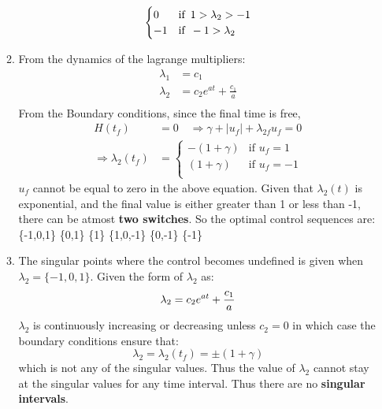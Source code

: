 \begin{enumerate}
\begin{enumerate}
\begin{align*}
\begin{cases}
                      0 & \mbox{if}\enskip 1 > \lambda_2 > -1\\
                      -1 & \mbox{if}\enskip -1 > \lambda_2 \\
                     \end{cases}
   \end{align*}
   \item From the dynamics of the lagrange multipliers:
   \begin{align*}
    \lambda_1 &= c_1\\
    \lambda_2 &= c_2 e^{at} + \frac{c_1}{a}\\
   \end{align*}
   From the Boundary conditions, since the final time is free,
   \begin{align*}
    H(t_f) &= 0 \quad \Rightarrow \gamma + |u_f| + \lambda_{2f} u_f = 0\\
    \Rightarrow \lambda_2(t_f) &= \begin{cases}
                                  -(1+\gamma) &\mbox{if } u_f = 1 \\
                                  (1+\gamma) & \mbox{if } u_f = -1\\
                                 \end{cases}
   \end{align*}
   $u_f$ cannot be equal to zero in the above equation. Given that $\lambda_2(t)$ is exponential,
and the final value is either greater than 1 or less than -1, there can be atmost \textbf{two
switches}. So the optimal control sequences are: \{-1,0,1\} \{0,1\} \{1\} \{1,0,-1\} \{0,-1\} \{-1\}
 
   \item The singular points where the control becomes undefined is given when $\lambda_2 =
\{-1,0,1\}$. Given the form of $\lambda_2$ as:
   \begin{equation*}
    \lambda_2 = c_2 e^{at} + \frac{c_1}{a}\\
   \end{equation*}
  $\lambda_2$ is continuously increasing or decreasing unless $c_2 = 0$ in which case the boundary
conditions ensure that:
  \begin{equation*}
   \lambda_2 = \lambda_2(t_f) = \pm (1 + \gamma)
  \end{equation*}
  which is not any of the singular values. Thus the value of $\lambda_2$ cannot stay at the singular
values for any time interval. Thus there are no \textbf{singular intervals}.
  

\end{enumerate}
\end{enumerate}
